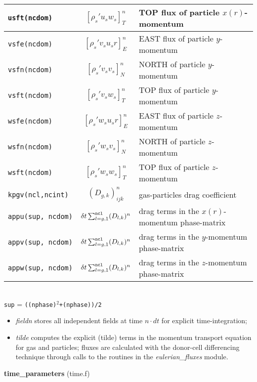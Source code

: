 \begin{tabular}{|p{4cm}|c|p{8cm}|}
\tt usft(ncdom) & $\left[ \rho_s' u_s w_s \right]_{T}^n$ & TOP flux of particle $x(r)$-momentum \\\hline
\tt vsfe(ncdom) & $\left[ \rho_s' v_s u_s r \right]_{E}^n$ & EAST flux of particle $y$-momentum \\\hline
\tt vsfn(ncdom) & $\left[ \rho_s' v_s v_s \right]_{N}^n$ & NORTH of particle $y$-momentum \\\hline
\tt vsft(ncdom) & $\left[ \rho_s' v_s w_s \right]_{T}^n$ & TOP flux of particle $y$-momentum \\\hline
\tt wsfe(ncdom) & $\left[ \rho_s' w_s u_s r \right]_{E}^n$ & EAST flux of particle $z$-momentum \\\hline
\tt wsfn(ncdom) & $\left[ \rho_s' w_s v_s \right]_{N}^n$ & NORTH of particle $z$-momentum \\\hline
\tt wsft(ncdom) & $\left[ \rho_s' w_s w_s \right]_{T}^n$ & TOP flux of particle $z$-momentum \\\hline

\tt kpgv(ncl,ncint) & $(D_{g,k})^n_{ijk}$ & gas-particles drag coefficient\\\hline
\tt appu(sup, ncdom) & $\delta t\sum_{l=g,1}^{\tt ncl}(D_{l,k})^n$ & drag terms in the $x(r)$-momentum phase-matrix\\\hline
\tt appv(sup, ncdom) &  $\delta t\sum_{l=g,1}^{\tt ncl}(D_{l,k})^n$ & drag terms in the $y$-momentum phase-matrix\\\hline
\tt appw(sup, ncdom) &  $\delta t\sum_{l=g,1}^{\tt ncl}(D_{l,k})^n$ & drag terms in the $z$-momentum phase-matrix\\\hline
\end{tabular}\\
{\tt sup} = {\tt ((nphase)$^2$+(nphase))/2}
\begin{itemize}
\item{\em fieldn} stores all independent fields at time $n\cdot dt$ for explicit time-integration;
\item{\em tilde} computes the explicit (tilde) terms in the momentum transport equation for gas and particles; fluxes are calculated with the donor-cell differencing technique through calls to the routines in the {\em eulerian\_fluxes} module.
\end{itemize}
%
%
{\large{\bf time\_parameters}} (time.f)\\[5mm]
